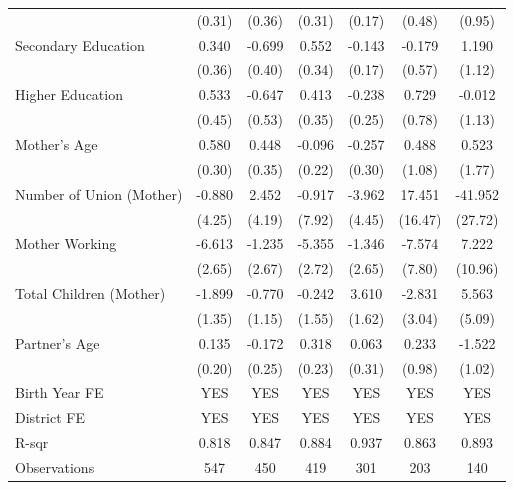 \begin{longtable}{l*{6}{c}}
                    & (0.31) & (0.36) & (0.31) & (0.17) & (0.48) & (0.95) \\
\hspace{1em}Secondary Education & 0.340 & -0.699\sym{*} & 0.552 & -0.143 & -0.179 & 1.190 \\
                    & (0.36) & (0.40) & (0.34) & (0.17) & (0.57) & (1.12) \\
\hspace{1em}Higher Education & 0.533 & -0.647 & 0.413 & -0.238 & 0.729 & -0.012 \\
                    & (0.45) & (0.53) & (0.35) & (0.25) & (0.78) & (1.13) \\
Mother's Age & 0.580\sym{*} & 0.448 & -0.096 & -0.257 & 0.488 & 0.523 \\
                    & (0.30) & (0.35) & (0.22) & (0.30) & (1.08) & (1.77) \\
Number of Union (Mother) & -0.880 & 2.452 & -0.917 & -3.962 & 17.451 & -41.952 \\
                    & (4.25) & (4.19) & (7.92) & (4.45) & (16.47) & (27.72) \\
Mother Working & -6.613\sym{**} & -1.235 & -5.355\sym{*} & -1.346 & -7.574 & 7.222 \\
                    & (2.65) & (2.67) & (2.72) & (2.65) & (7.80) & (10.96) \\
Total Children (Mother) & -1.899 & -0.770 & -0.242 & 3.610\sym{**} & -2.831 & 5.563 \\
                    & (1.35) & (1.15) & (1.55) & (1.62) & (3.04) & (5.09) \\
Partner's Age & 0.135 & -0.172 & 0.318 & 0.063 & 0.233 & -1.522 \\
                    & (0.20) & (0.25) & (0.23) & (0.31) & (0.98) & (1.02) \\
\hline
Birth Year FE & YES & YES & YES & YES & YES & YES \\
District FE & YES & YES & YES & YES & YES & YES \\
R-sqr & 0.818 & 0.847 & 0.884 & 0.937 & 0.863 & 0.893 \\
Observations & 547 & 450 & 419 & 301 & 203 & 140 \\
\hline\hline
\end{longtable}